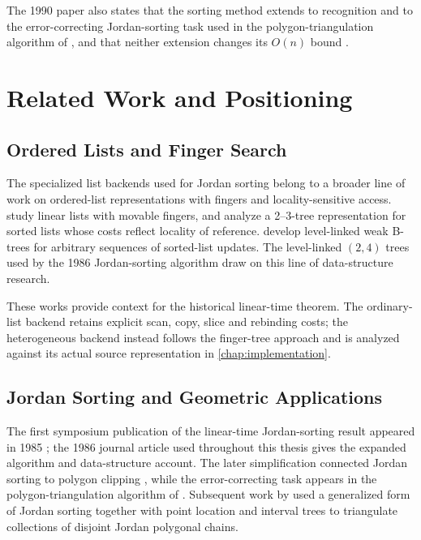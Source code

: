 The 1990 paper also states that the sorting method extends to recognition and
to the error-correcting Jordan-sorting task used in the polygon-triangulation
algorithm of \textcite{tarjan1988triangulating}, and that neither extension
changes its $O(n)$ bound \parencite[p.~91]{fung1990simplified}.

\section{Related Work and Positioning}
\label{sec:background-related-work}

\subsection{Ordered Lists and Finger Search}

The specialized list backends used for Jordan sorting belong to a broader
line of work on ordered-list representations with fingers and
locality-sensitive access. \Textcite{brown1978movable} study linear lists with
movable fingers, and \textcite{brown1980sorted} analyze a 2--3-tree
representation for sorted lists whose costs reflect locality of reference.
\Textcite{huddleston1982sorted} develop level-linked weak B-trees for arbitrary
sequences of sorted-list updates. The level-linked $(2,4)$ trees used by the
1986 Jordan-sorting algorithm draw on this line of data-structure research.

These works provide context for the historical linear-time theorem. The
ordinary-list backend retains explicit scan, copy, slice and rebinding costs;
the heterogeneous backend instead follows the finger-tree approach and is
analyzed against its actual source representation in \cref{chap:implementation}.

\subsection{Jordan Sorting and Geometric Applications}

The first symposium publication of the linear-time Jordan-sorting result
appeared in 1985 \parencite{hoffmann1985sorting}; the 1986 journal article used
throughout this thesis gives the expanded algorithm and data-structure account.
The later simplification connected Jordan sorting to polygon clipping
\parencite{fung1990simplified}, while the error-correcting task appears in the
polygon-triangulation algorithm of \textcite{tarjan1988triangulating}.
Subsequent work by \textcite{baryehuda1994triangulating} used a generalized
form of Jordan sorting together with point location and interval trees to
triangulate collections of disjoint Jordan polygonal chains.

